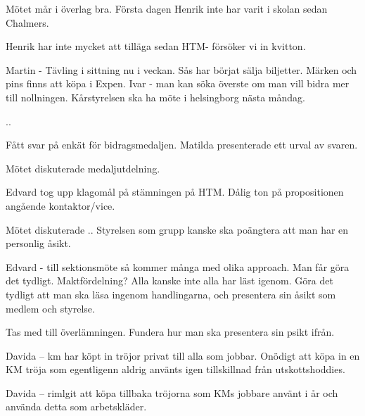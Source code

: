 \documentclass[10pt]{article}
\begin{document}
\begin{paragrafer}
\begin{fyllnadsval}
\end{fyllnadsval}

\begin{paragrafer}
Mötet mår i överlag bra. Första dagen Henrik inte har varit i skolan sedan Chalmers. 




Henrik har inte mycket att tilläga sedan HTM- försöker vi in kvitton. 

Martin - Tävling i sittning nu i veckan. Sås har börjat sälja biljetter. Märken och pins finns att köpa i Expen. 
Ivar - man kan söka överste om man vill bidra mer till nollningen. Kårstyrelsen ska ha möte i helsingborg nästa måndag. 




..
\end{paragrafer}

Fått svar på enkät för bidragsmedaljen. Matilda presenterade ett urval av svaren. 

Mötet diskuterade medaljutdelning. 


Edvard tog upp klagomål på stämningen på HTM. Dålig ton på propositionen angående kontaktor/vice. 

Mötet diskuterade .. Styrelsen som grupp kanske ska poängtera att man har en personlig åsikt. 

Edvard - till sektionsmöte så kommer många med olika approach. Man får göra det tydligt. Maktfördelning? 
Alla kanske inte alla har läst igenom. Göra det tydligt att man ska läsa ingenom handlingarna, och presentera sin åsikt som medlem och styrelse. 

Tas med till överlämningen. Fundera hur man ska presentera sin psikt ifrån. 



Davida -- km har köpt in tröjor privat till alla som jobbar. Onödigt att köpa in en KM tröja som egentligenn aldrig använts igen tillskillnad från utskottshoddies. 

Davida -- rimlgit att köpa tillbaka tröjorna som KMs jobbare använt i år och använda detta som arbetskläder.


\end{paragrafer}
\end{document}

